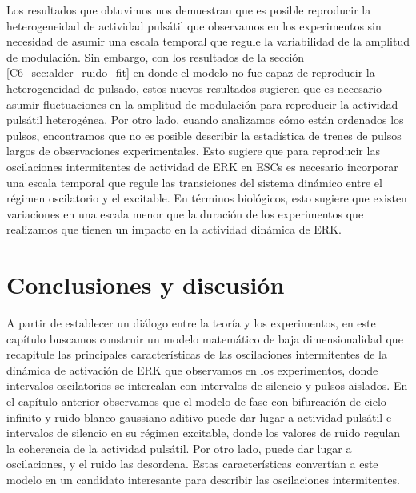 \documentclass[./main.tex]{subfiles}
\begin{document}
Los resultados que obtuvimos nos demuestran que es posible reproducir la heterogeneidad de actividad pulsátil que observamos en los experimentos sin necesidad de asumir una escala temporal que regule la variabilidad de la amplitud de modulación. Sin embargo, con los resultados de la sección \ref{C6_sec:alder_ruido_fit} en donde el modelo no fue capaz de reproducir la heterogeneidad de pulsado, estos nuevos resultados sugieren que es necesario asumir fluctuaciones en la amplitud de modulación para reproducir la actividad pulsátil heterogénea. Por otro lado, cuando analizamos cómo están ordenados los pulsos, encontramos que no es posible describir la estadística de trenes de pulsos largos de observaciones experimentales. Esto sugiere que para reproducir las oscilaciones intermitentes de actividad de ERK en ESCs es necesario incorporar una escala temporal que regule las transiciones del sistema dinámico entre el régimen oscilatorio y el excitable. En términos biológicos, esto sugiere que existen variaciones en una escala menor que la duración de los experimentos que realizamos que tienen un impacto en la actividad dinámica de ERK. 


\section{Conclusiones y discusión}

A partir de establecer un diálogo entre la teoría y los experimentos, en este capítulo buscamos construir un modelo matemático de baja dimensionalidad que recapitule las principales características de las oscilaciones intermitentes de la dinámica de activación de ERK que observamos en los experimentos, donde intervalos oscilatorios se intercalan con intervalos de silencio y pulsos aislados. En el capítulo anterior observamos que el modelo de fase con bifurcación de ciclo infinito y ruido blanco gaussiano aditivo puede dar lugar a actividad pulsátil e intervalos de silencio en su régimen excitable, donde los valores de ruido regulan la coherencia de la actividad pulsátil. Por otro lado, puede dar lugar a oscilaciones, y el ruido las desordena. Estas características convertían a este modelo en un candidato interesante para describir las oscilaciones intermitentes.
\end{document}

